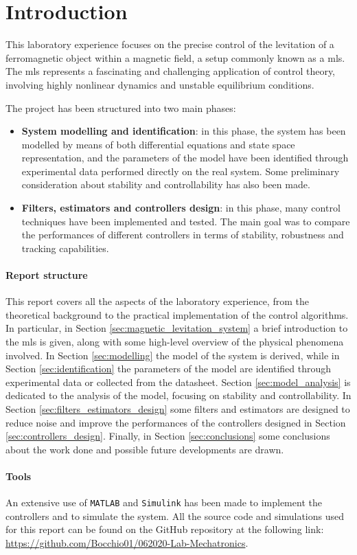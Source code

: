 \section{Introduction}
\label{sec:introduction}

This laboratory experience focuses on the precise control of the levitation of a ferromagnetic object within a magnetic field, a setup commonly known as a \acrfull{mls}.
The \acrshort{mls} represents a fascinating and challenging application of control theory, involving highly nonlinear dynamics and unstable equilibrium conditions.

The project has been structured into two main phases:

\begin{itemize}
    \item \textbf{System modelling and identification}: in this phase, the system has been modelled by means of both differential equations and state space representation, and the parameters of the model have been identified through experimental data performed directly on the real system. Some preliminary consideration about stability and controllability has also been made.
    \item \textbf{Filters, estimators and controllers design}: in this phase, many control techniques have been implemented and tested. The main goal was to compare the performances of different controllers in terms of stability, robustness and tracking capabilities.
\end{itemize}

\paragraph{Report structure}

This report covers all the aspects of the laboratory experience, from the theoretical background to the practical implementation of the control algorithms.
In particular, in Section \ref{sec:magnetic_levitation_system} a brief introduction to the \acrshort{mls} is given, along with some high-level overview of the physical phenomena involved.
In Section \ref{sec:modelling} the model of the system is derived, while in Section \ref{sec:identification} the parameters of the model are identified through experimental data or collected from the datasheet.
Section \ref{sec:model_analysis} is dedicated to the analysis of the model, focusing on stability and controllability.
In Section \ref{sec:filters_estimators_design} some filters and estimators are designed to reduce noise and improve the performances of the controllers designed in Section \ref{sec:controllers_design}.
Finally, in Section \ref{sec:conclusions} some conclusions about the work done and possible future developments are drawn.

\paragraph{Tools}

An extensive use of \texttt{MATLAB} and \texttt{Simulink} has been made to implement the controllers and to simulate the system.
All the source code and simulations used for this report can be found on the GitHub repository at the following link: \url{https://github.com/Bocchio01/062020-Lab-Mechatronics}.